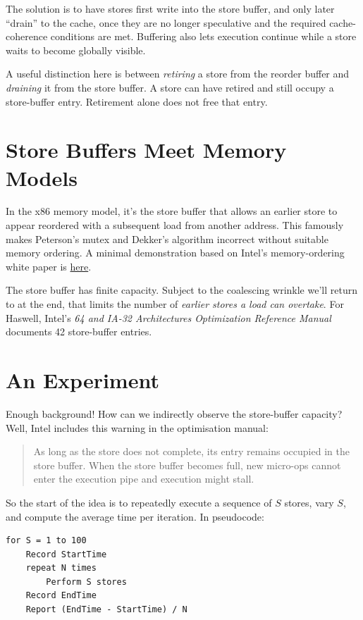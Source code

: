 \documentclass[11pt]{article}
\begin{document}
The solution is to have stores first write into the store buffer, and only later ``drain'' to the cache, once they are no longer speculative and the required cache-coherence conditions are met. Buffering also lets execution continue while a store waits to become globally visible.

A useful distinction here is between \emph{retiring} a store from the reorder buffer and \emph{draining} it from the store buffer. A store can have retired and still occupy a store-buffer entry. Retirement alone does not free that entry.

\section{Store Buffers Meet Memory Models}

In the x86 memory model, it's the store buffer that allows an earlier store to appear reordered with a subsequent load from another address. This famously makes Peterson's mutex and Dekker's algorithm incorrect without suitable memory ordering. A minimal demonstration based on Intel's memory-ordering white paper is \href{https://github.com/nicknash/StoreLoad}{here}.

The store buffer has finite capacity. Subject to the coalescing wrinkle we'll return to at the end, that limits the number of \emph{earlier stores a load can overtake}. For Haswell, Intel's \emph{64 and IA-32 Architectures Optimization Reference Manual} documents 42 store-buffer entries.

\section{An Experiment}

Enough background! How can we indirectly observe the store-buffer capacity? Well, Intel includes this warning in the optimisation manual:

\begin{quote}
As long as the store does not complete, its entry remains occupied in the store buffer. When the store buffer becomes full, new micro-ops cannot enter the execution pipe and execution might stall.
\end{quote}

So the start of the idea is to repeatedly execute a sequence of $S$ stores, vary $S$, and compute the average time per iteration. In pseudocode:

\begin{verbatim}
for S = 1 to 100
    Record StartTime
    repeat N times
        Perform S stores
    Record EndTime
    Report (EndTime - StartTime) / N
\end{verbatim}
\end{document}
